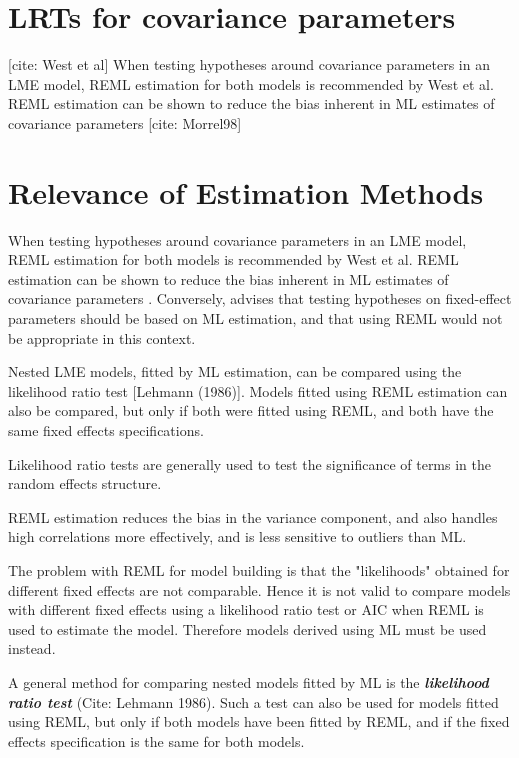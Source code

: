 \documentclass[12pt, a4paper]{report}
\theoremstyle{plain}
\theoremstyle{definition}
\theoremstyle{remark}
\begin{document}
\section{LRTs for covariance parameters}
[cite: West et al] When testing hypotheses around covariance parameters in an LME model, REML estimation for both models is recommended by West et al. REML estimation can be shown to reduce the bias inherent in ML estimates of covariance parameters [cite: Morrel98]



\section{Relevance of Estimation Methods}

When testing hypotheses around covariance parameters in an LME model, REML estimation for both models is recommended by West et al. REML estimation can be shown to reduce the bias inherent in ML estimates of covariance parameters \citep{west}. Conversely, \citet{pb} advises that testing hypotheses on fixed-effect parameters should be based on ML estimation, and that using REML would not be appropriate in this context.

Nested LME models, fitted by ML estimation, can be compared using the likelihood ratio test [Lehmann (1986)].
Models fitted using REML estimation can also be compared, but only if both were fitted using REML, and both have the same fixed effects specifications.

Likelihood ratio tests are generally used to test the significance of terms in the random effects structure.

REML estimation reduces the bias in the variance component, and also handles high correlations more effectively, and is less sensitive to outliers than ML.  

The problem with REML for model building is that the "likelihoods" obtained for different fixed effects are not comparable. Hence it is not valid to compare models with different fixed effects using a likelihood ratio test or AIC when REML is used to estimate the model. Therefore models derived using ML must be used instead.


A general method for comparing nested models fitted by ML is the \textbf{\emph{likelihood ratio test}} (Cite: Lehmann 1986). Such a test can also be used for models fitted using REML, but only if both models have been fitted by REML, and if the fixed effects specification is the same for both models.
\end{document}
